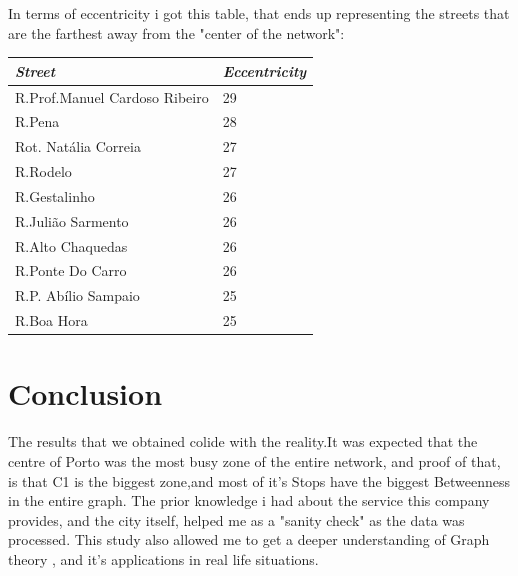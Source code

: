 \documentclass[12pt]{article}
\begin{document}
\begin{multicols}{2}
\begin{center}
\begin{tabular}[h]{|l|r|}
\hline
\end{tabular}
\end{center}

In terms of eccentricity i got this table, that ends up representing the streets that are the farthest away from the "center of the network":
\begin{center}
\begin{tabular}[h]{|l|l|}
\hline
\em{Street}	& \em{Eccentricity}\\
\hline
R.Prof.Manuel Cardoso Ribeiro & 29\\
R.Pena & 28\\
Rot. Natália Correia & 27\\
R.Rodelo & 27\\
R.Gestalinho & 26\\
R.Julião Sarmento &	26\\
R.Alto Chaquedas & 26\\
R.Ponte Do Carro & 26\\
R.P. Abílio Sampaio & 25\\
R.Boa Hora & 25\\
\hline
\end{tabular}
\end{center}



\section{Conclusion}
	The results that we obtained colide with the reality.It was expected that the centre of Porto was the most busy zone of the entire network, and proof of that, is that C1 is the biggest zone,and most of it's Stops have the biggest Betweenness in the entire graph. The prior knowledge i had about the service this company provides, and the city itself, helped me as a "sanity check" as the data was processed. This study also allowed me to get a deeper understanding of Graph theory , and it's applications in real life situations.

\end{multicols}	
\end{document}
